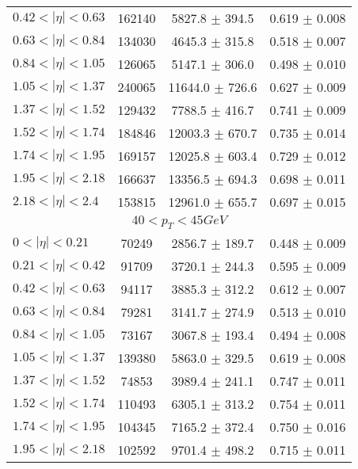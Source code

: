 \begin{tabular}{lccc}
$0.42 < |\eta| <0.63$          & 162140     & 5827.8     $\pm$ 394.5 & 0.619      $\pm$ 0.008 \\
$0.63 < |\eta| <0.84$          & 134030     & 4645.3     $\pm$ 315.8 & 0.518      $\pm$ 0.007 \\
$0.84 < |\eta| <1.05$          & 126065     & 5147.1     $\pm$ 306.0 & 0.498      $\pm$ 0.010 \\
$1.05 < |\eta| <1.37$          & 240065     & 11644.0    $\pm$ 726.6 & 0.627      $\pm$ 0.009 \\
$1.37 < |\eta| <1.52$          & 129432     & 7788.5     $\pm$ 416.7 & 0.741      $\pm$ 0.009 \\
$1.52 < |\eta| <1.74$          & 184846     & 12003.3    $\pm$ 670.7 & 0.735      $\pm$ 0.014 \\
$1.74 < |\eta| <1.95$          & 169157     & 12025.8    $\pm$ 603.4 & 0.729      $\pm$ 0.012 \\
$1.95 < |\eta| <2.18$          & 166637     & 13356.5    $\pm$ 694.3 & 0.698      $\pm$ 0.011 \\
$2.18 < |\eta| <2.4$           & 153815     & 12961.0    $\pm$ 655.7 & 0.697      $\pm$ 0.015 \\
\hline
\multicolumn{4}{c}{$40 < p_{T} < 45 GeV$} \\
\hline
$0 < |\eta| <0.21$             & 70249      & 2856.7     $\pm$ 189.7 & 0.448      $\pm$ 0.009 \\
$0.21 < |\eta| <0.42$          & 91709      & 3720.1     $\pm$ 244.3 & 0.595      $\pm$ 0.009 \\
$0.42 < |\eta| <0.63$          & 94117      & 3885.3     $\pm$ 312.2 & 0.612      $\pm$ 0.007 \\
$0.63 < |\eta| <0.84$          & 79281      & 3141.7     $\pm$ 274.9 & 0.513      $\pm$ 0.010 \\
$0.84 < |\eta| <1.05$          & 73167      & 3067.8     $\pm$ 193.4 & 0.494      $\pm$ 0.008 \\
$1.05 < |\eta| <1.37$          & 139380     & 5863.0     $\pm$ 329.5 & 0.619      $\pm$ 0.008 \\
$1.37 < |\eta| <1.52$          & 74853      & 3989.4     $\pm$ 241.1 & 0.747      $\pm$ 0.011 \\
$1.52 < |\eta| <1.74$          & 110493     & 6305.1     $\pm$ 313.2 & 0.754      $\pm$ 0.011 \\
$1.74 < |\eta| <1.95$          & 104345     & 7165.2     $\pm$ 372.4 & 0.750      $\pm$ 0.016 \\
$1.95 < |\eta| <2.18$          & 102592     & 9701.4     $\pm$ 498.2 & 0.715      $\pm$ 0.011 \\

\end{tabular}

